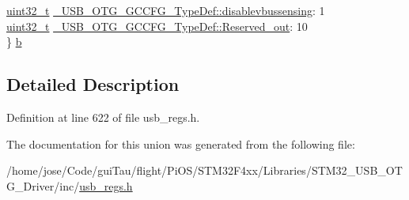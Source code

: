 \begin{DoxyCompactItemize}
\begin{tabbing}
\>\hyperlink{stdint_8h_a435d1572bf3f880d55459d9805097f62}{uint32\_t} \hyperlink{group___u_s_b___o_t_g___d_r_i_v_e_r_ga621c869741e314cdcdf1969b133e79af}{\_USB\_OTG\_GCCFG\_TypeDef::disablevbussensing}: 1\\
\>\hyperlink{stdint_8h_a435d1572bf3f880d55459d9805097f62}{uint32\_t} \hyperlink{group___u_s_b___o_t_g___d_r_i_v_e_r_gaca2c301103053094f91770ac5b6ddfc7}{\_USB\_OTG\_GCCFG\_TypeDef::Reserved\_out}: 10\\
\} \hyperlink{group___u_s_b___o_t_g___d_r_i_v_e_r_gacbc6de097009d1c0332acb2bf3c1885d}{b}\\

\end{tabbing}\end{DoxyCompactItemize}


\subsection{Detailed Description}


Definition at line 622 of file usb\-\_\-regs.\-h.



The documentation for this union was generated from the following file\-:\begin{DoxyCompactItemize}
\item 
/home/jose/\-Code/gui\-Tau/flight/\-Pi\-O\-S/\-S\-T\-M32\-F4xx/\-Libraries/\-S\-T\-M32\-\_\-\-U\-S\-B\-\_\-\-O\-T\-G\-\_\-\-Driver/inc/\hyperlink{_s_t_m32_f4xx_2_libraries_2_s_t_m32___u_s_b___o_t_g___driver_2inc_2usb__regs_8h}{usb\-\_\-regs.\-h}\end{DoxyCompactItemize}
